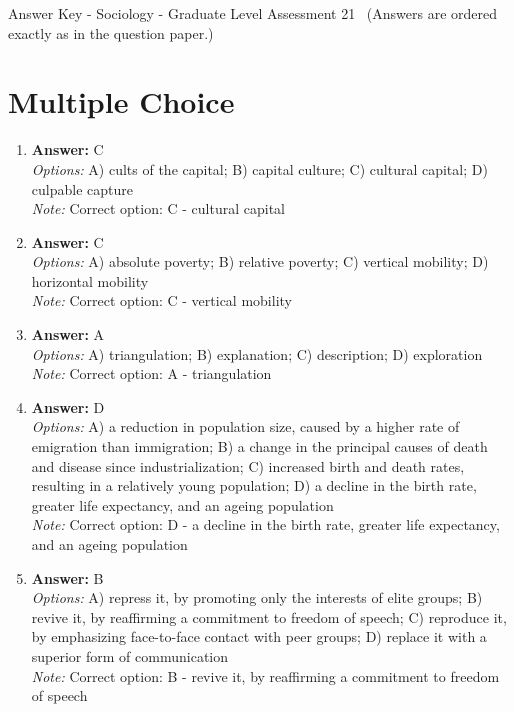 \documentclass[12pt]{article}
\begin{document}
\begin{center}
Answer Key - Sociology - Graduate Level Assessment 21 \
\small (Answers are ordered exactly as in the question paper.)
\end{center}

\section*{Multiple Choice}
\begin{enumerate}[label=\arabic*.]
\item \textbf{Answer:} C
\\ \textit{Options:} A) cults of the capital; B) capital culture; C) cultural capital; D) culpable capture
\\ \textit{Note:} Correct option: C - cultural capital
\item \textbf{Answer:} C
\\ \textit{Options:} A) absolute poverty; B) relative poverty; C) vertical mobility; D) horizontal mobility
\\ \textit{Note:} Correct option: C - vertical mobility
\item \textbf{Answer:} A
\\ \textit{Options:} A) triangulation; B) explanation; C) description; D) exploration
\\ \textit{Note:} Correct option: A - triangulation
\item \textbf{Answer:} D
\\ \textit{Options:} A) a reduction in population size, caused by a higher rate of emigration than immigration; B) a change in the principal causes of death and disease since industrialization; C) increased birth and death rates, resulting in a relatively young population; D) a decline in the birth rate, greater life expectancy, and an ageing population
\\ \textit{Note:} Correct option: D - a decline in the birth rate, greater life expectancy, and an ageing population
\item \textbf{Answer:} B
\\ \textit{Options:} A) repress it, by promoting only the interests of elite groups; B) revive it, by reaffirming a commitment to freedom of speech; C) reproduce it, by emphasizing face-to-face contact with peer groups; D) replace it with a superior form of communication
\\ \textit{Note:} Correct option: B - revive it, by reaffirming a commitment to freedom of speech
\end{enumerate}
\end{document}
